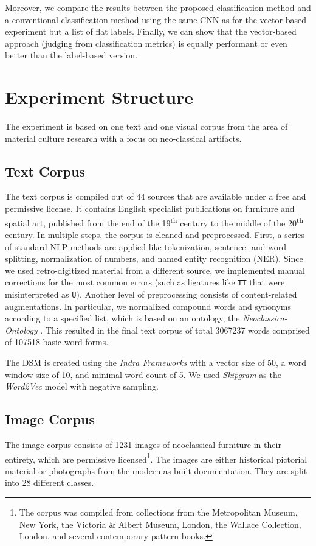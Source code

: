 Moreover, we compare the results between the proposed classification method and a conventional classification method using the same CNN as for the vector-based experiment but a list of flat labels. Finally, we can show that the vector-based approach (judging from classification metrics) is equally performant or even better than the label-based version.


\section{Experiment Structure}
The experiment is based on one text and one visual corpus from the area of material culture research with a focus on neo-classical artifacts.

\subsection{Text Corpus}
The text corpus is compiled out of 44 sources that are available under a free and permissive license. It contains English specialist publications on furniture and spatial art, published from the end of the 19\textsuperscript{th} century to the middle of the 20\textsuperscript{th} century. In multiple steps, the corpus is cleaned and preprocessed. First, a series of standard NLP methods are applied like tokenization, sentence- and word splitting, normalization of numbers, and named entity recognition (NER). Since we used retro-digitized material from a different source, we implemented manual corrections for the most common errors (such as ligatures like \texttt{TT} that were misinterpreted as \texttt{U}). Another level of preprocessing consists of content-related augmentations. In particular, we normalized compound words and synonyms according to a specified list, which is based on an ontology, the \emph{Neoclassica-Ontology} \parencite{donig_NeoclassicaMultilingualDomainOntology_2016}. This resulted in the final text corpus of total \num{3067237} words comprised of \num{107518} basic word forms.

The DSM is created using the \emph{Indra Frameworks} \parencite{sales_IndraWordEmbeddingSemanticRelatedness_2018a} with a vector size of \num{50}, a word window size of \num{10}, and minimal word count of \num{5}. We used \emph{Skipgram} as the \emph{Word2Vec} model \parencite{mikolov_EfficientEstimationWordRepresentationsVector_2013} with negative sampling.

\subsection{Image Corpus}
The image corpus consists of \num{1231} images of neoclassical furniture in their entirety, which are permissive licensed\footnote{The corpus was compiled from collections from the Metropolitan Museum, New York, the Victoria \& Albert Museum, London, the Wallace Collection, London, and several contemporary pattern books.}. The images are either historical pictorial material or photographs from the modern as-built documentation. They are split into \num{28} different classes.

